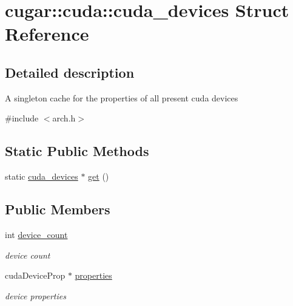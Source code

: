 \hypertarget{structcugar_1_1cuda_1_1cuda__devices}{}\section{cugar\+:\+:cuda\+:\+:cuda\+\_\+devices Struct Reference}
\label{structcugar_1_1cuda_1_1cuda__devices}


\subsection{Detailed description}
A singleton cache for the properties of all present cuda devices 

{\ttfamily \#include $<$arch.\+h$>$}

\subsection*{Static Public Methods}
\begin{DoxyCompactItemize}
\item 
static \hyperlink{structcugar_1_1cuda_1_1cuda__devices}{cuda\+\_\+devices} $\ast$ \hyperlink{structcugar_1_1cuda_1_1cuda__devices_ab146b0ff61956367c2338f0e3a31f3ec}{get} ()
\end{DoxyCompactItemize}
\subsection*{Public Members}
\begin{DoxyCompactItemize}
\item 
\mbox{\label{structcugar_1_1cuda_1_1cuda__devices_a6ac908ab562913227df6ecd8e9365901}} 
int \hyperlink{structcugar_1_1cuda_1_1cuda__devices_a6ac908ab562913227df6ecd8e9365901}{device\+\_\+count}
\begin{DoxyCompactList}\small\item\em device count \end{DoxyCompactList}\item 
\mbox{\label{structcugar_1_1cuda_1_1cuda__devices_ac50d1d6eeed53bc7f7709868ef6cdcd2}} 
cuda\+Device\+Prop $\ast$ \hyperlink{structcugar_1_1cuda_1_1cuda__devices_ac50d1d6eeed53bc7f7709868ef6cdcd2}{properties}
\begin{DoxyCompactList}\small\item\em device properties \end{DoxyCompactList}\end{DoxyCompactItemize}


